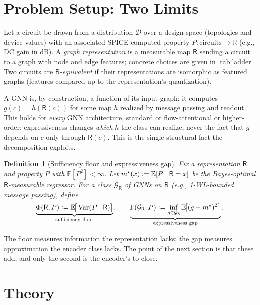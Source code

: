 \documentclass[10pt]{article}
\newtheorem{definition}{Definition}
\newcommand{\E}{\mathbb{E}}
\newcommand{\Var}{\operatorname{Var}}
\newcommand{\R}{\mathsf{R}}
\newcommand{\Gcal}{\mathcal{G}}
\newcommand{\eqdef}{\vcentcolon=}
\begin{document}
\section{Problem Setup: Two Limits}
\label{sec:setup}

Let a circuit be drawn from a distribution $\mathcal{D}$ over a design space (topologies and device values) with an associated SPICE-computed property $P:\text{circuits}\to\mathbb{R}$ (e.g., DC gain in dB). A \emph{graph representation} is a measurable map $\R$ sending a circuit to a graph with node and edge features; concrete choices are given in \cref{tab:ladder}. Two circuits are \emph{$\R$-equivalent} if their representations are isomorphic as featured graphs (features compared up to the representation's quantization).

A GNN is, by construction, a function of its input graph: it computes $g(c) = h(\R(c))$ for some map $h$ realized by message passing and readout. This holds for \emph{every} GNN architecture, standard or flow-attentional or higher-order; expressiveness changes \emph{which} $h$ the class can realize, never the fact that $g$ depends on $c$ only through $\R(c)$. This is the single structural fact the decomposition exploits.

\begin{definition}[Sufficiency floor and expressiveness gap]
\label{def:two}
Fix a representation $\R$ and property $P$ with $\E[P^2]<\infty$. Let $m^\star(x)\eqdef \E[P\mid \R=x]$ be the Bayes-optimal $\R$-measurable regressor. For a class $\Gcal_\R$ of GNNs on $\R$ (e.g., 1-WL-bounded message passing), define
\[
\underbrace{\Phi(\R,P)\eqdef \E\!\big[\Var(P\mid \R)\big]}_{\text{sufficiency floor}},
\qquad
\underbrace{\Gamma(\Gcal_\R,P)\eqdef \inf_{g\in\Gcal_\R}\E\!\big[(g-m^\star)^2\big]}_{\text{expressiveness gap}} .
\]
\end{definition}

The floor measures information the representation lacks; the gap measures approximation the encoder class lacks. The point of the next section is that these add, and only the second is the encoder's to close.

\section{Theory}
\label{sec:theory}
\end{document}
